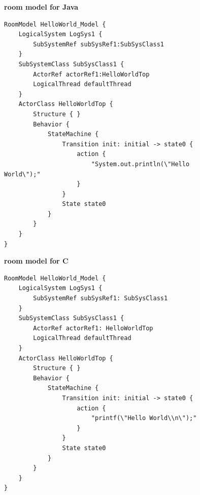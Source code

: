 \begin{figure}[ht]
\begin{minipage}[t]{0.50\linewidth}
\begin{mdframed}
	\textbf{room model for Java}
	\newline
\begin{lstlisting}[language=ROOM]
RoomModel HelloWorld_Model {
	LogicalSystem LogSys1 {
		SubSystemRef subSysRef1:SubSysClass1 
	}
	SubSystemClass SubSysClass1 {
		ActorRef actorRef1:HelloWorldTop 
		LogicalThread defaultThread
	}
	ActorClass HelloWorldTop {
		Structure { }
		Behavior {
			StateMachine {
				Transition init: initial -> state0 {
					action {
						"System.out.println(\"Hello World\");"
					}
				}
				State state0
			}
		}
	}
}
\end{lstlisting}
\end{mdframed}
\end{minipage}
\hspace{0.1cm}
\begin{minipage}[t]{0.50\linewidth}
\begin{mdframed}
	\textbf{room model for C}
	\newline
\begin{lstlisting}[language=ROOM]
RoomModel HelloWorld_Model {
	LogicalSystem LogSys1 {
		SubSystemRef subSysRef1: SubSysClass1
	}
	SubSystemClass SubSysClass1 {
		ActorRef actorRef1: HelloWorldTop
		LogicalThread defaultThread
	}
	ActorClass HelloWorldTop {
		Structure { }
		Behavior {
			StateMachine {
				Transition init: initial -> state0 {
					action {
						"printf(\"Hello World\\n\");"
					}
				}
				State state0
			}
		}
	}
}
\end{lstlisting}
\end{mdframed}
\end{minipage}
\end{figure}



